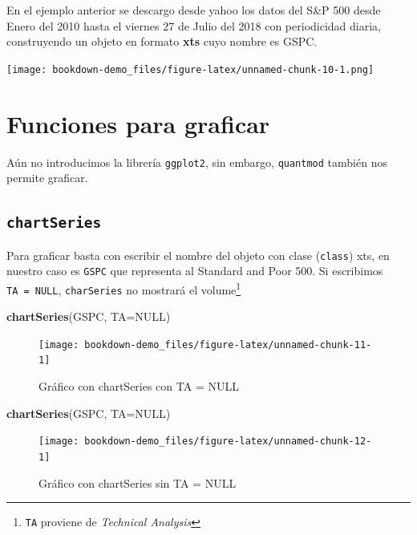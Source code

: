 \documentclass[12pt,]{book}
\newenvironment{Shaded}{\begin{snugshade}}{\end{snugshade}}
\newcommand{\KeywordTok}[1]{\textcolor[rgb]{0.13,0.29,0.53}{\textbf{#1}}}
\newcommand{\DataTypeTok}[1]{\textcolor[rgb]{0.13,0.29,0.53}{#1}}
\newcommand{\OtherTok}[1]{\textcolor[rgb]{0.56,0.35,0.01}{#1}}
\newcommand{\NormalTok}[1]{#1}
\begin{document}
En el ejemplo anterior se descargo desde yahoo los datos del S\&P 500
desde Enero del 2010 hasta el viernes 27 de Julio del 2018 con
periodicidad diaria, construyendo un objeto en formato \textbf{xts} cuyo
nombre es GSPC.

\texttt{[image: bookdown-demo\_files/figure-latex/unnamed-chunk-10-1.png]}

\section{Funciones para graficar}\label{funciones-para-graficar}

Aún no introducimos la librería \texttt{ggplot2}, sin embargo,
\texttt{quantmod} también nos permite graficar.

\subsection{\texorpdfstring{\texttt{chartSeries}}{chartSeries}}\label{chartseries}

Para graficar basta con escribir el nombre del objeto con clase
(\texttt{class}) xts, en nuestro caso es \texttt{GSPC} que representa al
Standard and Poor 500. Si escribimos \texttt{TA\ =\ NULL},
\texttt{charSeries} no mostrará el volume\footnote{\texttt{TA} proviene
  de \emph{Technical Analysis}}

\begin{Shaded}
\begin{Highlighting}[]
\KeywordTok{chartSeries}\NormalTok{(GSPC, }\DataTypeTok{TA=}\OtherTok{NULL}\NormalTok{)}
\end{Highlighting}
\end{Shaded}

\begin{figure}

{\centering \texttt{[image: bookdown-demo\_files/figure-latex/unnamed-chunk-11-1]} 

}

\caption{Gráfico con chartSeries con TA = NULL}\label{fig:unnamed-chunk-11}
\end{figure}

\begin{Shaded}
\begin{Highlighting}[]
\KeywordTok{chartSeries}\NormalTok{(GSPC, }\DataTypeTok{TA=}\OtherTok{NULL}\NormalTok{)}
\end{Highlighting}
\end{Shaded}

\begin{figure}

{\centering \texttt{[image: bookdown-demo\_files/figure-latex/unnamed-chunk-12-1]} 

}

\caption{Gráfico con chartSeries sin TA = NULL}\label{fig:unnamed-chunk-12}
\end{figure}
\end{document}
